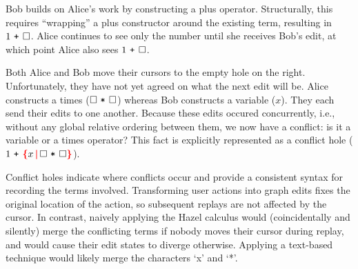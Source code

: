 \documentclass[nonacm, acmsmall, screen, review]{acmart}
\newcommand{\id}[1]{\textcolor{gray}{\ensuremath{#1}}}
\newcommand{\eid}[2]{{#2}^{\id{#1}}}
\newcommand{\hole}{\ensuremath{\square}} %
\newcommand{\conflictHole}[1]{%
{\noexpandarg\StrSubstitute{#1}{,}{\textcolor{red}{\,\textbf{|}\,}}[\myargs]%
{\textcolor{red}{\textbf{\{}}\myargs\textcolor{red}{\textbf{\}}}}}}%
\newcommand{\ePlus}[3]{#2~\eid{#1}{\texttt{+}}~#3}
\newcommand{\eTimes}[3]{#2~\eid{#1}{\texttt{*}}~#3}
\begin{document}
Bob builds on Alice's work by constructing a plus operator.
Structurally, this requires ``wrapping'' a plus constructor around the existing term, resulting in $\ePlus{}{1}{\hole}$.
Alice continues to see only the number until she receives Bob's edit,
at which point Alice also sees $\ePlus{}{1}{\hole}$.





Both Alice and Bob move their cursors to the empty hole on the right.
Unfortunately, they have not yet agreed on what the next edit will be.
Alice constructs a times ($\eTimes{}{\hole}{\hole}$) whereas Bob constructs a variable ($x$).
They each send their edits to one another.
Because these edits occured concurrently, i.e., without any global relative ordering between them, we now have a conflict: is it a variable or a times operator?
This fact is explicitly represented as a conflict hole ($\ePlus{}{1}{\conflictHole{x, \eTimes{}{\hole}{\hole}}}$).

Conflict holes indicate where conflicts occur and provide a consistent syntax for recording the terms involved.
Transforming user actions into graph edits fixes the original location of the action, so subsequent replays are not affected by the cursor.
In contrast, naively applying the Hazel calculus would (coincidentally and silently) merge the conflicting terms if nobody moves their cursor during replay, 
and would cause their edit states to diverge otherwise.
Applying a text-based technique would likely merge the characters `x' and `*'.
\end{document}
